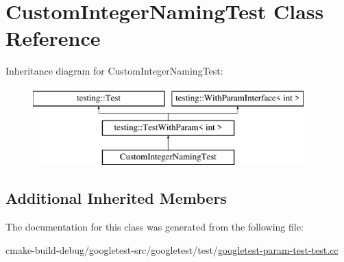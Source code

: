 \hypertarget{classCustomIntegerNamingTest}{}\section{Custom\+Integer\+Naming\+Test Class Reference}
\label{classCustomIntegerNamingTest}
Inheritance diagram for Custom\+Integer\+Naming\+Test\+:\begin{figure}[H]
\begin{center}
\leavevmode
\includegraphics[height=3.000000cm]{classCustomIntegerNamingTest}
\end{center}
\end{figure}
\subsection*{Additional Inherited Members}


The documentation for this class was generated from the following file\+:\begin{DoxyCompactItemize}
\item 
cmake-\/build-\/debug/googletest-\/src/googletest/test/\mbox{\hyperlink{googletest-param-test-test_8cc}{googletest-\/param-\/test-\/test.\+cc}}\end{DoxyCompactItemize}
